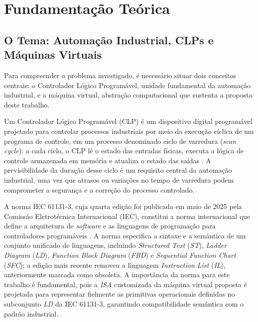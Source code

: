 \chapter{Fundamentação Teórica}
\label{cap:fundamentacao}

\section{O Tema: Automação Industrial, CLPs e Máquinas Virtuais}
\label{sec:tema}

Para compreender o problema investigado, é necessário situar dois conceitos centrais: o Controlador Lógico Programável, unidade fundamental da automação industrial, e a máquina virtual, abstração computacional que sustenta a proposta deste trabalho.

Um Controlador Lógico Programável (CLP) é um dispositivo digital programável projetado para controlar processos industriais por meio da execução cíclica de um programa de controle, em um processo denominado ciclo de varredura (\textit{scan cycle}): a cada ciclo, o CLP lê o estado das entradas físicas, executa a lógica de controle armazenada em memória e atualiza o estado das saídas \cite{bolton:2015}.
A previsibilidade da duração desse ciclo é um requisito central da automação industrial, uma vez que atrasos ou variações no tempo de varredura podem comprometer a segurança e a correção do processo controlado.

A norma IEC 61131-3, cuja quarta edição foi publicada em maio de 2025 pela Comissão Eletrotécnica Internacional (IEC), constitui a norma internacional que define a arquitetura de \textit{software} e as linguagens de programação para controladores programáveis \cite{iec:2025}.
A norma especifica a sintaxe e a semântica de um conjunto unificado de linguagens, incluindo \textit{Structured Text} (\textit{ST}), \textit{Ladder Diagram} (\textit{LD}), \textit{Function Block Diagram} (\textit{FBD}) e \textit{Sequential Function Chart} (\textit{SFC}); a edição mais recente removeu a linguagem \textit{Instruction List} (\textit{IL}), anteriormente marcada como obsoleta.
A importância da norma para este trabalho é fundamental, pois a \textit{ISA} customizada da máquina virtual proposta é projetada para representar fielmente as primitivas operacionais definidas no subconjunto \textit{LD} da IEC 61131-3, garantindo compatibilidade semântica com o padrão industrial.


